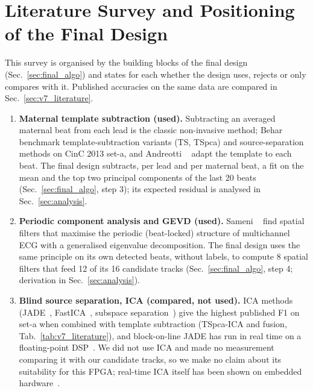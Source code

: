 \section{Literature Survey and Positioning of the Final Design}
\label{sec:literature_survey}
\begin{finalpart}
This survey is organised by the building blocks of the final design (Sec.~\ref{sec:final_algo}) and states for each whether the design uses, rejects or only compares with it. Published accuracies on the same data are compared in Sec.~\ref{sec:v7_literature}.

\begin{enumerate}
    \item \textbf{Maternal template subtraction (used).} Subtracting an averaged maternal beat from each lead is the classic non-invasive method; Behar \etal~\cite{behar2014b} benchmark template-subtraction variants (TS, TSpca) and source-separation methods on CinC 2013 set-a, and Andreotti \etal~\cite{andreotti2014} adapt the template to each beat. The final design subtracts, per lead and per maternal beat, a fit on the mean and the top two principal components of the last 20 beats (Sec.~\ref{sec:final_algo}, step 3); its expected residual is analysed in Sec.~\ref{sec:analysis}.
    \item \textbf{Periodic component analysis and GEVD (used).} Sameni \etal~\cite{sameni2008} find spatial filters that maximise the periodic (beat-locked) structure of multichannel ECG with a generalised eigenvalue decomposition. The final design uses the same principle on its own detected beats, without labels, to compute 8 spatial filters that feed 12 of its 16 candidate tracks (Sec.~\ref{sec:final_algo}, step 4; derivation in Sec.~\ref{sec:analysis}).
    \item \textbf{Blind source separation, ICA (compared, not used).} ICA methods (JADE~\cite{cardoso1999}, FastICA~\cite{hyvarinen2000}, subspace separation~\cite{delathauwer2000}) give the highest published F1 on set-a when combined with template subtraction (TSpca-ICA and fusion, Tab.~\ref{tab:v7_literature}), and block-on-line JADE has run in real time on a floating-point DSP~\cite{muceli2007}. We did not use ICA and made no measurement comparing it with our candidate tracks, so we make no claim about its suitability for this FPGA; real-time ICA itself has been shown on embedded hardware~\cite{muceli2007}.

\end{enumerate}
\end{finalpart}
